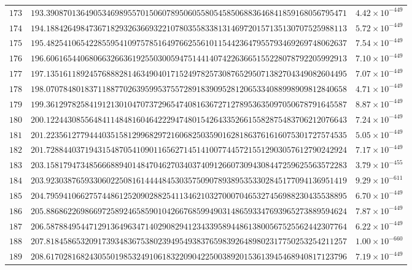 \documentclass[12pt,reqno]{amsart}
\theoremstyle{remark}
\begin{document}
\begin{longtable}{clc}
$173$ & $193.3908701364905346989557015060789506055805458506883646841859168056795471$ & $4.42\times 10^{-449}$ \\
$174$ & $194.1884264984736718293263669322107803558338131469720157135130707525988113$ & $5.72\times 10^{-449}$ \\
$175$ & $195.4825410654228559541097578516497662556101154423647955793469269748062637$ & $7.54\times 10^{-449}$ \\
$176$ & $196.6061654406806632663619255030059475144140742263665155228078792205992913$ & $7.10\times 10^{-449}$ \\
$177$ & $197.1351611892457688828146349040171524978257308765295071382704349082604495$ & $7.07\times 10^{-449}$ \\
$178$ & $198.0707848018371188770263959953755728918390952812065334088998909812840658$ & $4.71\times 10^{-449}$ \\
$179$ & $199.3612978258419121301047073729654740816367271278953635097050678791645587$ & $8.87\times 10^{-449}$ \\
$180$ & $200.1224430855648411484816046422294748015426433526615582875483706212076643$ & $7.24\times 10^{-449}$ \\
$181$ & $201.2235612779444035158129968297216068250359016281863761616075301727574535$ & $5.05\times 10^{-449}$ \\
$182$ & $201.7288440371943154870541090116562714514100774457215512903057612790242924$ & $7.17\times 10^{-449}$ \\
$183$ & $203.1581794734856668894014847046270340374091266073094308447259625563572283$ & $3.79\times 10^{-455}$ \\
$184$ & $203.9230387659330602250816144448453035750907893895353302845177094136951419$ & $9.29\times 10^{-611}$ \\
$185$ & $204.7959410662757448612520902882541134621032700070465327456988230435538895$ & $6.70\times 10^{-449}$ \\
$186$ & $205.8868622698669725892465859010426676859949031486593347693965273889594624$ & $7.87\times 10^{-449}$ \\
$187$ & $206.5878849544712913649634714029082941234339589448613800567525562442307764$ & $6.22\times 10^{-449}$ \\
$188$ & $207.8184586532091739348367538023949549383765983926489802317750253254211257$ & $1.00\times 10^{-660}$ \\
$189$ & $208.6170281682430550198532491061832209042250038920153613945468940817123796$ & $7.19\times 10^{-449}$ \\

\end{longtable}
\end{document}
